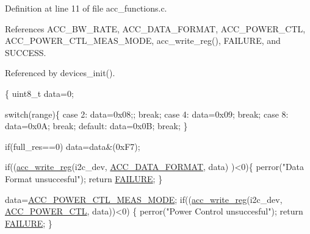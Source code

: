 Definition at line 11 of file acc\-\_\-functions.\-c.



References A\-C\-C\-\_\-\-B\-W\-\_\-\-R\-A\-T\-E, A\-C\-C\-\_\-\-D\-A\-T\-A\-\_\-\-F\-O\-R\-M\-A\-T, A\-C\-C\-\_\-\-P\-O\-W\-E\-R\-\_\-\-C\-T\-L, A\-C\-C\-\_\-\-P\-O\-W\-E\-R\-\_\-\-C\-T\-L\-\_\-\-M\-E\-A\-S\-\_\-\-M\-O\-D\-E, acc\-\_\-write\-\_\-reg(), F\-A\-I\-L\-U\-R\-E, and S\-U\-C\-C\-E\-S\-S.



Referenced by devices\-\_\-init().


\begin{DoxyCode}
\{ 
  uint8\_t data=0;

  \textcolor{keywordflow}{switch}(range)\{
    \textcolor{keywordflow}{case} 2:
      data=0x08;;
      \textcolor{keywordflow}{break};
    \textcolor{keywordflow}{case} 4:
      data=0x09;
      \textcolor{keywordflow}{break};
    \textcolor{keywordflow}{case} 8:
      data=0x0A;
      \textcolor{keywordflow}{break};
    \textcolor{keywordflow}{default}:
      data=0x0B;
      \textcolor{keywordflow}{break};
  \}
  
  \textcolor{keywordflow}{if}(full\_res==0)
    data=data&(0xF7);
  
  \textcolor{keywordflow}{if}((\hyperlink{group__acc_ga534116416343122de29a5b6ade6876bd}{acc\_write\_reg}(i2c\_dev, \hyperlink{imu__regs_8h_ab4eb7fc69b2a37ee750d3400fc2c53a1}{ACC\_DATA\_FORMAT}, data)
      )<0)\{
    perror(\textcolor{stringliteral}{"Data Format unsuccesful"});
    \textcolor{keywordflow}{return} \hyperlink{calibration_2calibration_8h_a6d58f9ac447476b4e084d7ca383f5183}{FAILURE};
  \}
  
  data=\hyperlink{imu__regs_8h_a9a841ba3e094b01ea439584e12b25894}{ACC\_POWER\_CTL\_MEAS\_MODE};
  \textcolor{keywordflow}{if}((\hyperlink{group__acc_ga534116416343122de29a5b6ade6876bd}{acc\_write\_reg}(i2c\_dev, \hyperlink{imu__regs_8h_ad857d62b61f349216faeda06eff5f9c6}{ACC\_POWER\_CTL}, data))<0)
      \{
    perror(\textcolor{stringliteral}{"Power Control unsuccesful"});
    \textcolor{keywordflow}{return} \hyperlink{calibration_2calibration_8h_a6d58f9ac447476b4e084d7ca383f5183}{FAILURE};
  \}
  

\end{DoxyCode}
